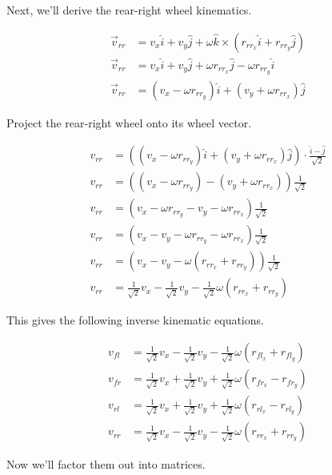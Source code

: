 Next, we'll derive the rear-right wheel kinematics.

\begin{align*}
  \vec{v}_{rr} &= v_x \hat{i} + v_y \hat{j} +
    \omega \hat{k} \times (r_{rr_x} \hat{i} + r_{rr_y} \hat{j}) \\
  \vec{v}_{rr} &= v_x \hat{i} + v_y \hat{j} +
    \omega r_{rr_x} \hat{j} - \omega r_{rr_y} \hat{i} \\
  \vec{v}_{rr} &= (v_x - \omega r_{rr_y}) \hat{i} +
    (v_y + \omega r_{rr_x}) \hat{j}
\end{align*}

Project the rear-right wheel onto its wheel vector.

\begin{align}
  v_{rr} &= ((v_x - \omega r_{rr_y}) \hat{i} + (v_y + \omega r_{rr_x}) \hat{j})
    \cdot \frac{\hat{i} - \hat{j}}{\sqrt{2}} \nonumber \\
  v_{rr} &= ((v_x - \omega r_{rr_y}) - (v_y + \omega r_{rr_x}))
    \frac{1}{\sqrt{2}} \nonumber \\
  v_{rr} &= (v_x - \omega r_{rr_y} - v_y - \omega r_{rr_x})
    \frac{1}{\sqrt{2}} \nonumber \\
  v_{rr} &= (v_x - v_y - \omega r_{rr_y} - \omega r_{rr_x})
    \frac{1}{\sqrt{2}} \nonumber \\
  v_{rr} &= (v_x - v_y - \omega (r_{rr_x} + r_{rr_y}))
    \frac{1}{\sqrt{2}} \nonumber \\
  v_{rr} &= \frac{1}{\sqrt{2}} v_x - \frac{1}{\sqrt{2}} v_y -
    \frac{1}{\sqrt{2}} \omega (r_{rr_x} + r_{rr_y})
\end{align}

This gives the following inverse kinematic equations.

\begin{align*}
  v_{fl} &= \frac{1}{\sqrt{2}} v_x - \frac{1}{\sqrt{2}} v_y -
    \frac{1}{\sqrt{2}} \omega (r_{fl_x} + r_{fl_y}) \\
  v_{fr} &= \frac{1}{\sqrt{2}} v_x + \frac{1}{\sqrt{2}} v_y +
    \frac{1}{\sqrt{2}} \omega (r_{fr_x} - r_{fr_y}) \\
  v_{rl} &= \frac{1}{\sqrt{2}} v_x + \frac{1}{\sqrt{2}} v_y +
    \frac{1}{\sqrt{2}} \omega (r_{rl_x} - r_{rl_y}) \\
  v_{rr} &= \frac{1}{\sqrt{2}} v_x - \frac{1}{\sqrt{2}} v_y -
    \frac{1}{\sqrt{2}} \omega (r_{rr_x} + r_{rr_y})
\end{align*}

Now we'll factor them out into matrices.

